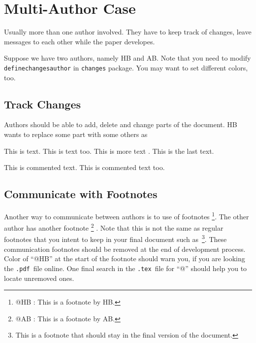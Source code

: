 \documentclass[10pt,journal,compsoc]{IEEEtran}
\makeatletter
\newcommand{\hCode}[1]{\texttt{#1}}
\newcommand{\hbFootnote}[2]{\footnote{{\color{red} @#1 : }#2}}
\theoremstyle{plain}
\theoremstyle{definition}
\theoremstyle{remark}
\newcommand{\hbDTex}{\hCode{.tex}}
\newcommand{\hbDPdf}{\hCode{.pdf}}
\makeatother
\begin{document}
\section{Multi-Author Case}

Usually more than one author involved.
They have to keep track of changes, leave messages to each other
while the paper developes.

Suppose we have two authors, namely HB and AB.
Note that you need to modify 
\hCode{definechangesauthor}
in 
\hCode{changes} package.
You may want to set different colors, too.



\subsection{Track Changes}
\label{sec:trackChanges}

Authors should be able to add, delete and change parts of the document.
HB wants to replace some part with some others as

This is  text.
This is  text too.
This is more  text
.
This is the last  text.

This is commented text.
This is commented text too.


\subsection{Communicate with Footnotes}

Another way to communicate between authors is to use of footnotes
\hbFootnote{HB}{
	This is a footnote by HB.
}.
The other author has another footnote
\hbFootnote{AB}{
	This is a footnote by AB.
}
.
Note that this is not the same as regular footnotes that you intent to keep in your final document such as~\footnote{
	This is a footnote that should stay in the final version of the document.
}.
These communication footnotes should be removed at the end of development process.
Color of ``@HB'' at the start of the footnote should warn you, if you are looking the \hbDPdf\ file online.
One final search in the \hbDTex\ file for ``@'' should help you to locate unremoved ones.
\end{document}
